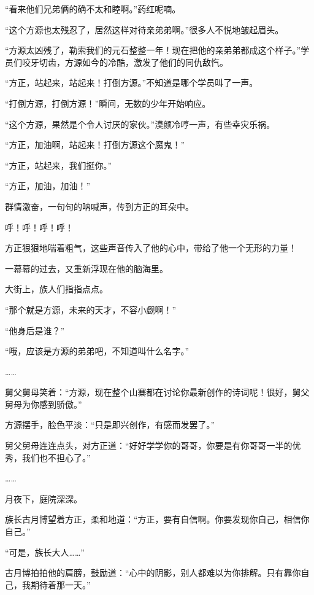 
\begin{this_body}

“看来他们兄弟俩的确不太和睦啊。”药红呢喃。

“这个方源也太残忍了，居然这样对待亲弟弟啊。”很多人不悦地皱起眉头。

“方源太凶残了，勒索我们的元石整整一年！现在把他的亲弟弟都成这个样子。”学员们咬牙切齿，方源如今的冷酷，激发了他们的同仇敌忾。

“方正，站起来，站起来！打倒方源。”不知道是哪个学员叫了一声。

“打倒方源，打倒方源！”瞬间，无数的少年开始响应。

“这个方源，果然是个令人讨厌的家伙。”漠颜冷哼一声，有些幸灾乐祸。

“方正，加油啊，站起来！打倒方源这个魔鬼！”

“方正，站起来，我们挺你。”

“方正，加油，加油！”

群情激奋，一句句的呐喊声，传到方正的耳朵中。

呼！呼！呼！呼！

方正狠狠地喘着粗气，这些声音传入了他的心中，带给了他一个无形的力量！

一幕幕的过去，又重新浮现在他的脑海里。

大街上，族人们指指点点。

“那个就是方源，未来的天才，不容小觑啊！”

“他身后是谁？”

“哦，应该是方源的弟弟吧，不知道叫什么名字。”

……

舅父舅母笑着：“方源，现在整个山寨都在讨论你最新创作的诗词呢！很好，舅父舅母为你感到骄傲。”

方源摆手，脸色平淡：“只是即兴创作，有感而发罢了。”

舅父舅母连连点头，对方正道：“好好学学你的哥哥，你要是有你哥哥一半的优秀，我们也不担心了。”

……

月夜下，庭院深深。

族长古月博望着方正，柔和地道：“方正，要有自信啊。你要发现你自己，相信你自己。”

“可是，族长大人……”

古月博拍拍他的肩膀，鼓励道：“心中的阴影，别人都难以为你排解。只有靠你自己，我期待着那一天。”


\end{this_body}

